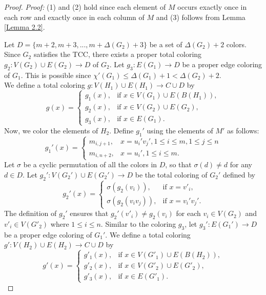 \documentclass[12pt]{article}
\theoremstyle{definition}
\begin{document}
\begin{proof}
\textit{Proof:}
(1) and (2) hold since each element of $M$
occurs exactly once in each row and exactly once in each column of $M$ and (3) follows from Lemma \ref{Lemma 2.2}.

Let $D=\{m+2, m+3,...,m+\Delta(G_{2})+3\}$ be a set of $\Delta(G_2)+2$ colors.
Since $G_2$ satisfies the TCC, there exists a proper total coloring $g_2:V(G_2)\cup E(G_2)\rightarrow D$ of $G_2$.
Let $g_3:E(G_1)\rightarrow D$ be a proper edge coloring of $G_1$. This is possible since $\chi'(G_1)\leq \Delta(G_1)+1<\Delta(G_2)+2$.\\
We define a total coloring
$g:V(H_1)\cup E(H_1)\rightarrow C\cup D$ by
\[
g(x)=
\begin{cases}
g_1(x), & \text{if } x\in V(G_1)\cup E(B(H_1)),\\
g_2(x), & \text{if } x\in V(G_2)\cup E(G_2),\\
g_3(x), & \text{if } x\in E(G_1).
\end{cases}
\]
Now, we color the elements of $H_2$.
Define $g_1'$ using the elements of $M'$ as follows:
\[
g_1'(x)=
\begin{cases}
m_{i,j+1}, & x=u_i'v_j', 1\leq i\leq m, 1\leq j\leq n\\[2mm]
m_{i,n+2}, & x=u_i', 1\leq i\leq m.
\end{cases}
\]
Let $\sigma$ be a cyclic permutation of all the colors in $D$, so that $\sigma(d)\neq d$ for any $d\in D$. 
Let $g_2':V(G_2')\cup E(G_2')\rightarrow D$ be the total coloring of $G_2'$  defined by 
\[
g_2'(x)=
\begin{cases}
\sigma(g_2(v_i)), & \text{if }x=v'_i,\\[1mm]
\sigma(g_2(v_iv_j)), & \text{if }x=v_i'v_j'.
\end{cases}
\]
The definition of $g_2'$ ensures that $g_2'(v'_i)\neq g_2(v_i)$ for each $v_i\in V(G_2)$ and $v'_i\in V(G'_2)$ where $1\leq i\leq n$.
Similar to the coloring $g_3$, let $g_3': E(G_1')\rightarrow D$ be a proper edge coloring  of $G_1'$. 
We define a total coloring
$g':V(H_2)\cup E(H_2)\rightarrow C\cup D$ by
\[
g'(x)=
\begin{cases}
g'_1(x), & \text{if } x\in V(G'_1)\cup E(B(H_2)),\\
g'_2(x), & \text{if } x\in V(G'_2)\cup E(G'_2),\\
g'_3(x), & \text{if } x\in E(G'_1).

\end{cases}\]
\end{proof}
\end{document}
